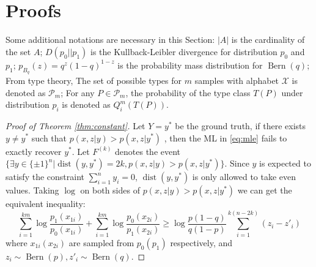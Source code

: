 \documentclass[conference]{IEEEtran}
\DeclareMathOperator{\dist}{dist}
\DeclareMathOperator{\Bern}{Bern}
\begin{document}
\section{Proofs}\label{s:proof}
Some additional notations are necessary in this Section: $|A|$ is the cardinality of the set $A$;
$D(p_0 || p_1)$ is the Kullback-Leibler divergence for distribution $p_0$ and $p_1$;
$p_{B_q}(z) = q^z(1-q)^{1-z}$ is the probability mass distribution for $\Bern(q)$;
From type theory, The set of possible types
for $m$ samples with alphabet $\mathcal{X}$ is denoted as $\mathcal{P}_m$; For any $P\in \mathcal{P}_m$, the probability of the type
class $T(P)$ under distribution $p_i$ is denoted as $Q_i^{m}(T(P))$.
\begin{proof}[Proof of Theorem \ref{thm:constant}]
Let $Y=y^*$ be the ground truth, if there exists $y\neq y^*$ such that $p(x,z|y) > p(x,z|y^*)$	,
then the ML in \eqref{eq:mle} fails to exactly recover $y^*$. Let $F^{(k)}$ denotes
the event $\{\exists y \in \{\pm 1\}^n | \dist(y, y^*)=2k, p(x,z|y) > p(x,z|y^*) \}$. Since
$y$ is expected to satisfy the constraint $\sum_{i=1}^n y_i=0$, $\dist(y, y^*)$ is only allowed to take even
values. Taking $\log$ on both sides of $p(x,z|y) > p(x,z|y^*)$ we can get the equivalent inequality:
{\footnotesize
\begin{equation}\label{eq:ein}
\sum_{i=1}^{km} \log \frac{p_1(x_{1i})}{p_0(x_{1i})}
+\sum_{i=1}^{km} \log \frac{p_0(x_{2i})}{p_1(x_{2i})}
\geq \log \frac{p(1-q)}{q(1-p)} \sum_{i=1}^{k(n-2k)}(z_{i} - z'_{i})
\end{equation}
}
where $x_{1i}(x_{2i})$ are sampled from $p_0(p_1)$ respectively,
and $z_{i} \sim \Bern(p), z'_{i} \sim \Bern(q)$.


\end{proof}
\end{document}
